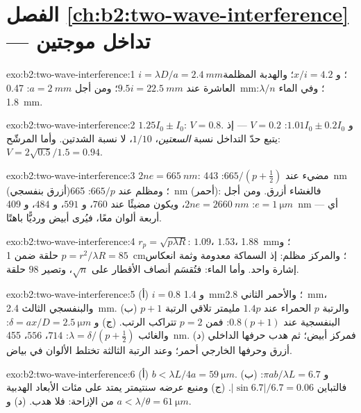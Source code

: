 \section*{الفصل \ref{ch:b2:two-wave-interference} --- تداخل موجتين}

\begin{solution}{exo:b2:two-wave-interference:1}
$i = \lambda D/a = \qty{2.4}{mm}$؛ و $x/i = 4.2$؛ والهدبة المظلمة العاشرة عند $9.5i = \qty{22.5}{mm}$؛
ومن أجل $a = \qty{2}{mm}$: \qty{0.47}{mm}؛ وفي الماء $\lambda/n$: \qty{1.8}{mm}.
\end{solution}

\begin{solution}{exo:b2:two-wave-interference:2}
$1.25I_0 \pm I_0$: $V = 0.8$. و $1.01I_0 \pm 0.2I_0$: $V = 0.2$ --- إذ يتبع حدّ التداخل
نسبة \emph{السعتين}، $1/10$، لا نسبة الشدتين. وأما المرشّح:
$V = 2\sqrt{0.5}/1.5 = 0.94$.
\end{solution}

\begin{solution}{exo:b2:two-wave-interference:3}
$2ne = \qty{665}{nm}$: مضيء عند $665/(p + \tfrac12)$: \qty{443}{nm} (أزرق بنفسجي)؛
ومظلم عند $665/p$: \qty{665}{nm} (أحمر): فالغشاء أزرق. ومن أجل $e = \qty{1}{\micro m}$: $2ne = \qty{2660}{nm}$،
ويكون مضيئًا عند $760$، و $591$، و $484$، و \qty{409}{nm} --- أي أربعة ألوان معًا، فيُرى
أبيض ورديًّا باهتًا.
\end{solution}

\begin{solution}{exo:b2:two-wave-interference:4}
$r_p = \sqrt{p\lambda R}$: $1.09$، $1.53$، \qty{1.88}{mm}؛ و $p = r^2/\lambda R = 85$ حلقة ضمن
\qty{1}{cm}؛ والمركز مظلم: إذ السماكة معدومة وثمة انعكاس إشارة واحد. وأما الماء:
فتُقسَم أنصاف الأقطار على $\sqrt n$، وتصير $98$ حلقة.
\end{solution}

\begin{solution}{exo:b2:two-wave-interference:5}
(أ) $i = 0.8$ و \qty{1.4}{mm}؛ والأحمر الثاني \qty{2.8}{mm}، والبنفسجي الثالث \qty{2.4}{mm}.
(ب) والرتبة $p$ الحمراء عند $1.4p$ مليمتر تلاقي الرتبة $p + 1$ البنفسجية عند $0.8(p + 1)$: فمن
$p = 2$ تتراكب الرتب. (ج) و $\delta = ax/D = \qty{2.5}{\micro m}$: والغائب $\lambda = \delta/(p +
\tfrac12)$: $714$، $556$، \qty{455}{nm}. (د) فمركز أبيض؛ ثم هدب حرفها
الداخلي أزرق وحرفها الخارجي أحمر؛ وعند الرتبة الثالثة تختلط الألوان
في بياض.
\end{solution}

\begin{solution}{exo:b2:two-wave-interference:6}
(أ) $b < \lambda L/4a = \qty{59}{\micro m}$. (ب) و $\pi ab/\lambda L = 6.7$: فالتباين $|\sin6.7|/6.7
= 0.06$. (ج) ومنبع عرضه سنتيمتر يمتد على مئات الأبعاد الهدبية من
الإزاحة: فلا هدب. (د) و $a < \lambda/\theta = \qty{61}{\micro m}$.
\end{solution}

